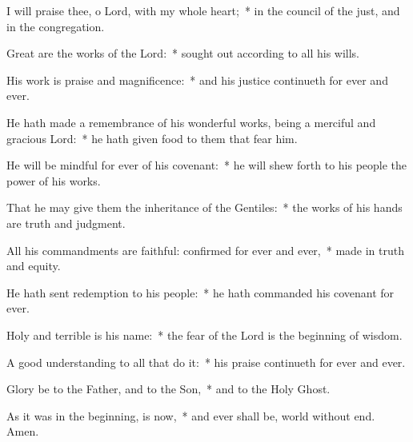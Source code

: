 \begin{enpars}
\item I will praise thee, o Lord, with my whole heart;~* in the council of the just, and in the congregation.
\item Great are the works of the Lord:~* sought out according to all his wills.
\item His work is praise and magnificence:~* and his justice continueth for ever and ever.
\item He hath made a remembrance of his wonderful works, being a merciful and gracious Lord:~* he hath given food to them that fear him.
\item He will be mindful for ever of his covenant:~* he will shew forth to his people the power of his works.
\item That he may give them the inheritance of the Gentiles:~* the works of his hands are truth and judgment.
\item All his commandments are faithful: confirmed for ever and ever,~* made in truth and equity.
\item He hath sent redemption to his people:~* he hath commanded his covenant for ever.
\item Holy and terrible is his name:~* the fear of the Lord is the beginning of wisdom.
\item A good understanding to all that do it:~* his praise continueth for ever and ever.
\item Glory be to the Father, and to the Son,~* and to the Holy Ghost. 
\item As it was in the beginning, is now,~* and ever shall be, world without end. Amen.
\end{enpars}